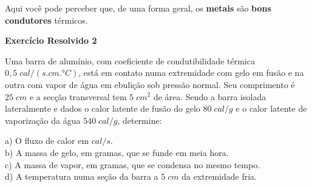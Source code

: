 \documentclass[12pt,twoside]{article}
\begin{document}
Aqui você pode perceber que, de uma forma geral, os \textbf{metais} são \textbf{bons condutores} térmicos.


\textbf{Exercício Resolvido 2}


Uma barra de alumínio, com coeficiente de condutibilidade térmica $0,5\;cal/(s.cm.°C)$, está em contato numa extremidade com gelo em fusão e na outra com vapor de água em ebulição sob pressão normal. Seu comprimento é $25\;cm$ e a secção transversal tem $5\;cm^{2}$ de área. Sendo a barra isolada lateralmente e dados o calor latente de fusão do gelo $80\;cal/g$ e o calor latente de vaporização da água $540\;cal/g$, determine:


a) O fluxo de calor em $cal/s$. \\
b) A massa de gelo, em gramas, que se funde em meia hora. \\
c) A massa de vapor, em gramas, que se condensa no mesmo tempo. \\
d) A temperatura numa seção da barra a $5\;cm$ da extremidade fria.
\end{document}
